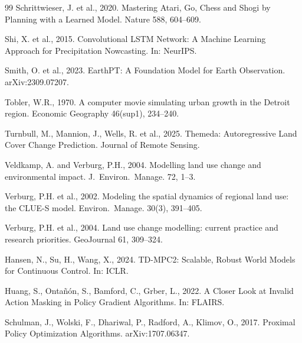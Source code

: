 \documentclass{article}
\begin{document}
\begin{thebibliography}{99}
Schrittwieser, J. et al., 2020. Mastering Atari, Go, Chess and Shogi by Planning with a Learned Model. Nature 588, 604--609.

Shi, X. et al., 2015. Convolutional LSTM Network: A Machine Learning Approach for Precipitation Nowcasting. In: NeurIPS.

Smith, O. et al., 2023. EarthPT: A Foundation Model for Earth Observation. arXiv:2309.07207.

Tobler, W.R., 1970. A computer movie simulating urban growth in the Detroit region. Economic Geography 46(sup1), 234--240.

Turnbull, M., Mannion, J., Wells, R. et al., 2025. Themeda: Autoregressive Land Cover Change Prediction. Journal of Remote Sensing.

Veldkamp, A. and Verburg, P.H., 2004. Modelling land use change and environmental impact. J.~Environ.~Manage. 72, 1--3.

Verburg, P.H. et al., 2002. Modeling the spatial dynamics of regional land use: the CLUE-S model. Environ.~Manage. 30(3), 391--405.

Verburg, P.H. et al., 2004. Land use change modelling: current practice and research priorities. GeoJournal 61, 309--324.

Hansen, N., Su, H., Wang, X., 2024. TD-MPC2: Scalable, Robust World Models for Continuous Control. In: ICLR.

Huang, S., Onta\~{n}\'{o}n, S., Bamford, C., Grber, L., 2022. A Closer Look at Invalid Action Masking in Policy Gradient Algorithms. In: FLAIRS.

Schulman, J., Wolski, F., Dhariwal, P., Radford, A., Klimov, O., 2017. Proximal Policy Optimization Algorithms. arXiv:1707.06347.

\end{thebibliography}
\end{document}
